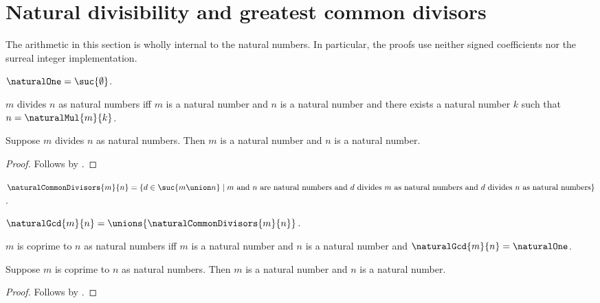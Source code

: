 

\section{Natural divisibility and greatest common divisors}

The arithmetic in this section is wholly internal to the natural numbers.
In particular, the proofs use neither signed coefficients nor the surreal
integer implementation.

\begin{definition}\label{natural_one}
    $\naturalOne=\suc{\emptyset}$.
\end{definition}

\begin{definition}\label{natural_divisibility}
    $m$ divides $n$ as natural numbers iff
        $m$ is a natural number and $n$ is a natural number and
        there exists a natural number $k$ such that
            $n=\naturalMul{m}{k}$.
\end{definition}

\begin{proposition}\label{natural_divisibility_guards}
    Suppose $m$ divides $n$ as natural numbers.
    Then $m$ is a natural number and $n$ is a natural number.
\end{proposition}
\begin{proof}
    Follows by .
\end{proof}

\begin{definition}\label{common_divisors}
    $\naturalCommonDivisors{m}{n}=
        \{d\in\suc{m\union n}\mid
            \text{$m$ and $n$ are natural numbers and
                $d$ divides $m$ as natural numbers and
                $d$ divides $n$ as natural numbers}\}$.
\end{definition}

\begin{definition}\label{natural_gcd}
    $\naturalGcd{m}{n}=\unions{\naturalCommonDivisors{m}{n}}$.
\end{definition}

\begin{definition}\label{coprime_naturals}
    $m$ is coprime to $n$ as natural numbers iff
        $m$ is a natural number and $n$ is a natural number and
        $\naturalGcd{m}{n}=\naturalOne$.
\end{definition}

\begin{proposition}\label{coprime_naturals_guards}
    Suppose $m$ is coprime to $n$ as natural numbers.
    Then $m$ is a natural number and $n$ is a natural number.
\end{proposition}
\begin{proof}
    Follows by .
\end{proof}

